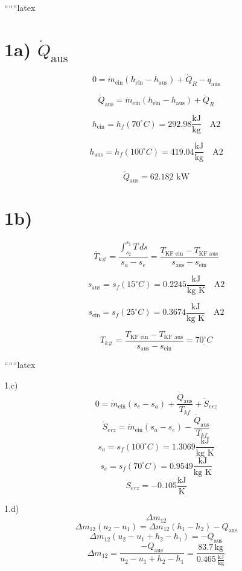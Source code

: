 
``````latex


\section*{1a) $\dot{Q}_{\text{aus}}$}

\[
0 = \dot{m}_{\text{ein}} \left( h_{\text{ein}} - h_{\text{aus}} \right) + \dot{Q}_R - \dot{q}_{\text{aus}}
\]

\[
\dot{Q}_{\text{aus}} = \dot{m}_{\text{ein}} \left( h_{\text{ein}} - h_{\text{aus}} \right) + \dot{Q}_R
\]

\[
h_{\text{ein}} = h_f(70^\circ C) = 292.98 \frac{\text{kJ}}{\text{kg}} \quad \text{A2}
\]

\[
h_{\text{aus}} = h_f(100^\circ C) = 419.04 \frac{\text{kJ}}{\text{kg}} \quad \text{A2}
\]

\[
\dot{Q}_{\text{aus}} = \underline{62.182 \text{ kW}}
\]

\section*{1b)}

\[
\overline{T}_{k\#} = \frac{\int_{s_2}^{s_1} T \, ds}{s_a - s_e} = \frac{T_{\text{KF ein}} - T_{\text{KF aus}}}{s_{\text{aus}} - s_{\text{ein}}}
\]

\[
s_{\text{aus}} = s_f(15^\circ C) = 0.2245 \frac{\text{kJ}}{\text{kg K}} \quad \text{A2}
\]

\[
s_{\text{ein}} = s_f(25^\circ C) = 0.3674 \frac{\text{kJ}}{\text{kg K}} \quad \text{A2}
\]

\[
T_{k\#} = \frac{T_{\text{KF ein}} - T_{\text{KF aus}}}{s_{\text{aus}} - s_{\text{ein}}} = \underline{70^\circ C}
\]

``````latex


1.c)
\[
0 = \dot{m}_{\text{ein}} (s_e - s_a) + \frac{\dot{Q}_{\text{aus}}}{T_{kf}} + \dot{S}_{erz}
\]
\[
\dot{S}_{erz} = \dot{m}_{\text{ein}} (s_a - s_e) - \frac{\dot{Q}_{\text{aus}}}{T_{kf}}
\]
\[
s_a = s_f (100^\circ C) = 1.3069 \frac{\text{kJ}}{\text{kg K}}
\]
\[
s_e = s_f (70^\circ C) = 0.9549 \frac{\text{kJ}}{\text{kg K}}
\]
\[
\dot{S}_{erz} = -0.105 \frac{\text{kJ}}{\text{K}}
\]

1.d)
\[
\Delta m_{12}
\]
\[
\Delta m_{12} (u_2 - u_1) = \Delta m_{12} (h_1 - h_2) - Q_{\text{aus}}
\]
\[
\Delta m_{12} \left( u_2 - u_1 + h_2 - h_1 \right) = -Q_{\text{aus}}
\]
\[
\Delta m_{12} = \frac{-Q_{\text{aus}}}{u_2 - u_1 + h_2 - h_1} = \frac{83.7 \, \text{kg}}{0.465 \, \frac{\text{kJ}}{\text{kg}}}
\]


